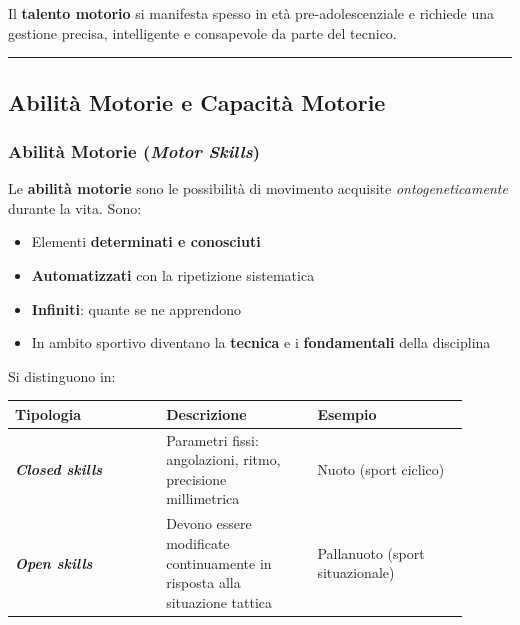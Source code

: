 \documentclass[a4paper,11pt]{article}
\providecommand{\tightlist}{%
  \setlength{\itemsep}{0pt}\setlength{\parskip}{0pt}}
\begin{document}
Il \textbf{talento motorio} si manifesta spesso in età
pre-adolescenziale e richiede una gestione precisa, intelligente e
consapevole da parte del tecnico.

\begin{center}\rule{0.5\linewidth}{0.5pt}\end{center}

\subsection{Abilità Motorie e Capacità
      Motorie}\label{abilituxe0-motorie-e-capacituxe0-motorie}

\subsubsection{\texorpdfstring{Abilità Motorie (\emph{Motor
                  Skills})}{Abilità Motorie (Motor Skills)}}\label{abilituxe0-motorie-motor-skills}

Le \textbf{abilità motorie} sono le possibilità di movimento acquisite
\emph{ontogeneticamente} durante la vita. Sono:

\begin{itemize}
      \tightlist
      \item
            Elementi \textbf{determinati e conosciuti}
      \item
            \textbf{Automatizzati} con la ripetizione sistematica
      \item
            \textbf{Infiniti}: quante se ne apprendono
      \item
            In ambito sportivo diventano la \textbf{tecnica} e i
            \textbf{fondamentali} della disciplina
\end{itemize}

Si distinguono in:

\begin{longtable}[]{@{}p{0.30\linewidth}p{0.30\linewidth}p{0.30\linewidth}@{}}
      \toprule\noalign{}
      Tipologia                        & Descrizione                               & Esempio \\
      \midrule\noalign{}
      \endhead
      \bottomrule\noalign{}
      \endlastfoot
      \textbf{\emph{Closed skills}}    & Parametri fissi: angolazioni, ritmo,
      precisione millimetrica          & Nuoto (sport ciclico)                               \\
      \textbf{\emph{Open skills}}      & Devono essere modificate continuamente in
      risposta alla situazione tattica & Pallanuoto (sport situazionale)                     \\
\end{longtable}
\end{document}

